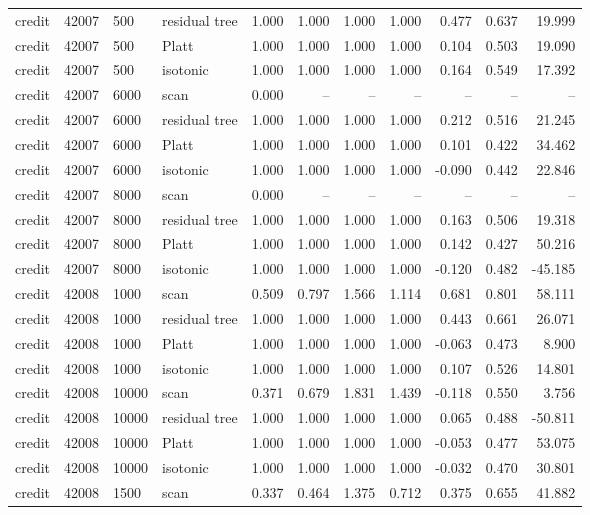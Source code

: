 \begin{tabular}{lrllrrrrrrr}
credit & 42007 & 500 & residual tree & 1.000 & 1.000 & 1.000 & 1.000 & 0.477 & 0.637 & 19.999 \\
credit & 42007 & 500 & Platt & 1.000 & 1.000 & 1.000 & 1.000 & 0.104 & 0.503 & 19.090 \\
credit & 42007 & 500 & isotonic & 1.000 & 1.000 & 1.000 & 1.000 & 0.164 & 0.549 & 17.392 \\
credit & 42007 & 6000 & scan & 0.000 & -- & -- & -- & -- & -- & -- \\
credit & 42007 & 6000 & residual tree & 1.000 & 1.000 & 1.000 & 1.000 & 0.212 & 0.516 & 21.245 \\
credit & 42007 & 6000 & Platt & 1.000 & 1.000 & 1.000 & 1.000 & 0.101 & 0.422 & 34.462 \\
credit & 42007 & 6000 & isotonic & 1.000 & 1.000 & 1.000 & 1.000 & -0.090 & 0.442 & 22.846 \\
credit & 42007 & 8000 & scan & 0.000 & -- & -- & -- & -- & -- & -- \\
credit & 42007 & 8000 & residual tree & 1.000 & 1.000 & 1.000 & 1.000 & 0.163 & 0.506 & 19.318 \\
credit & 42007 & 8000 & Platt & 1.000 & 1.000 & 1.000 & 1.000 & 0.142 & 0.427 & 50.216 \\
credit & 42007 & 8000 & isotonic & 1.000 & 1.000 & 1.000 & 1.000 & -0.120 & 0.482 & -45.185 \\
credit & 42008 & 1000 & scan & 0.509 & 0.797 & 1.566 & 1.114 & 0.681 & 0.801 & 58.111 \\
credit & 42008 & 1000 & residual tree & 1.000 & 1.000 & 1.000 & 1.000 & 0.443 & 0.661 & 26.071 \\
credit & 42008 & 1000 & Platt & 1.000 & 1.000 & 1.000 & 1.000 & -0.063 & 0.473 & 8.900 \\
credit & 42008 & 1000 & isotonic & 1.000 & 1.000 & 1.000 & 1.000 & 0.107 & 0.526 & 14.801 \\
credit & 42008 & 10000 & scan & 0.371 & 0.679 & 1.831 & 1.439 & -0.118 & 0.550 & 3.756 \\
credit & 42008 & 10000 & residual tree & 1.000 & 1.000 & 1.000 & 1.000 & 0.065 & 0.488 & -50.811 \\
credit & 42008 & 10000 & Platt & 1.000 & 1.000 & 1.000 & 1.000 & -0.053 & 0.477 & 53.075 \\
credit & 42008 & 10000 & isotonic & 1.000 & 1.000 & 1.000 & 1.000 & -0.032 & 0.470 & 30.801 \\
credit & 42008 & 1500 & scan & 0.337 & 0.464 & 1.375 & 0.712 & 0.375 & 0.655 & 41.882 \\

\end{tabular}
